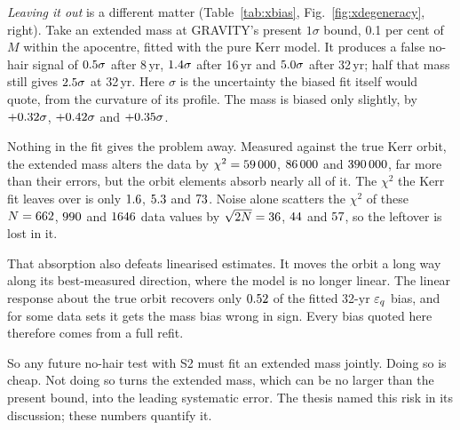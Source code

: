 \emph{Leaving it out} is a different matter (Table~\ref{tab:xbias},
Fig.~\ref{fig:xdegeneracy}, right). Take an extended mass at GRAVITY's present
$1\sigma$ bound, 0.1 per cent of $M$ within the apocentre, fitted with the
pure Kerr model. It produces a false no-hair signal of $0.5\sigma$
after 8\,yr, $1.4\sigma$ after 16\,yr and
$5.0\sigma$ after 32\,yr; half that mass still gives
$2.5\sigma$ at 32\,yr. Here $\sigma$ is the uncertainty
the biased fit itself would quote, from the curvature of its profile. The
mass is biased only slightly, by $+0.32\sigma$,
$+0.42\sigma$ and $+0.35\sigma$.

Nothing in the fit gives the problem away. Measured against the true Kerr
orbit, the extended mass alters the data by $\chi^2 = 59\,000$,
$86\,000$ and $390\,000$, far more than their
errors, but the orbit elements absorb nearly all of it. The $\chi^2$ the Kerr fit leaves over is only $1.6$,
$5.3$ and $73$. Noise alone scatters the
$\chi^2$ of these $N = 662$, $990$ and
$1646$ data values by $\sqrt{2N} = 36$,
$44$ and $57$, so the leftover is
lost in it.

That absorption also defeats linearised estimates. It moves the orbit a long
way along its best-measured direction, where the model is no longer linear.
The linear response about the true orbit recovers only
$0.52$ of the fitted 32-yr $\epsq$ bias, and for some
data sets it gets the mass bias wrong in sign. Every bias quoted here
therefore comes from a full refit.

So any future no-hair test with S2 must fit an extended mass jointly. Doing so
is cheap. Not doing so turns the extended mass, which can be no larger than
the present bound, into the leading systematic error. The thesis named this
risk in its discussion; these numbers quantify it.

\begin{table}
\centering
\caption{An extended mass (Plummer, scale $\XFcPlummer''$) present in the
data but left out of the fit: biases of the 13-parameter Kerr fit in $M$ and
$R_0$ and the $\chi^2$ it leaves, and the false no-hair signal in the thesis'
$\epsq$ profile. Noise-free data on the \citet{Gillessen2017} epochs, plus
the stated years of GRAVITY-era monitoring. For $M$ and $R_0$, $\sigma$ is the
forecast uncertainty of the same data set; for $\epsq$ it is the uncertainty
the biased fit itself would quote, from the curvature of its profile.}
\label{tab:xbias}
\small\setlength{\tabcolsep}{4pt}

\end{table}

